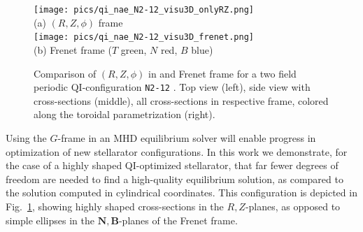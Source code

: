 \documentclass[12pt]{iopart}
\newcommand\Nnew{{\bm N}}
\newcommand\Bnew{{\bm B}}
\newcommand\GFF{$G$-frame}
\newcommand\RZplanes[1]{$R,Z$-planes{#1}}
\newcommand\NBplanes[1]{$\Nnew,\Bnew$-planes{#1}}
\begin{document}
\begin{figure}[htbp!]
    \centering
    \texttt{[image: pics/qi\_nae\_N2-12\_visu3D\_onlyRZ.png]}\\[1ex](a) $(R,Z,\phi)$ frame\\[2ex]
    \texttt{[image: pics/qi\_nae\_N2-12\_visu3D\_frenet.png]}\\[1ex](b) Frenet frame ($T$ green, $N$ red, $B$ blue) \\
    \caption{Comparison of $(R,Z,\phi)$ in and Frenet frame for a two field periodic QI-configuration \texttt{N2-12} \cite{plunk2024-QI}. Top view (left), side view with cross-sections (middle), all cross-sections in respective frame, colored along the toroidal parametrization (right). }
    \label{fig:comparison}
\end{figure}

Using the \GFF{} in an MHD equilibrium solver will enable progress in optimization of new stellarator configurations. In this work we demonstrate, for the case of a highly shaped QI-optimized stellarator, that far fewer degrees of freedom are needed to find a high-quality equilibrium solution, as compared to the solution computed in cylindrical coordinates.  This configuration is depicted in Fig.~\ref{fig:comparison}, showing highly shaped cross-sections in the \RZplanes{}, as opposed to simple ellipses in the \NBplanes{ } of the Frenet frame. 
\end{document}
